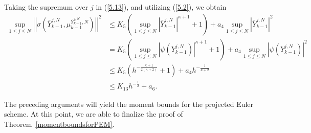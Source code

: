 \documentclass[12pt]{article}
\numberwithin{equation}{section}
\begin{document}
Taking the supremum over $ j $ in (\ref{5.13}), and utilizing 
(\ref{5.2}), we obtain
\begin{equation}\tag{5.63}\label{5.15}
\begin{aligned}
\underset{1\leqslant j\leqslant N}{\sup}\left|\left|\sigma\left(\bar{Y}^{j,N}_{k-1},\mu^{\bar{Y}^{j,N}_{k-1},N}_{k-1}\right)\right| \right|^2
&\leq K_5\left( \underset{1\leqslant j\leqslant N}{\sup}\left|\bar{Y}^{j,N}_{k-1}\right|^{\kappa+1}+1 \right) +a_4\underset{1\leqslant j\leqslant N}{\sup}\left|\bar{Y}^{j,N}_{k-1}\right|^2\\
&= K_5\left( \underset{1\leqslant j\leqslant N}{\sup}\left|\psi \left(Y_{k-1}^{j,N}\right)\right|^{\kappa+1}+1 \right) +a_4\underset{1\leqslant j\leqslant N}{\sup}\left|\psi \left(Y_{k-1}^{j,N}\right)\right|^2\\
&\leq K_5\left(h^{-\frac{\kappa+1}{2\left( \kappa +2 \right)}}+1\right)+a_4h^{-\frac{1}{ \kappa +2 }}\\
&\leq K_{13} h^{-\frac{1}{2}}+a_6.
\end{aligned}
\end{equation}
 
The preceding arguments will yield the moment bounds for the projected Euler scheme. At this point, we are able to  finalize the proof of Theorem~\ref{momentboundsforPEM}.
\end{document}

